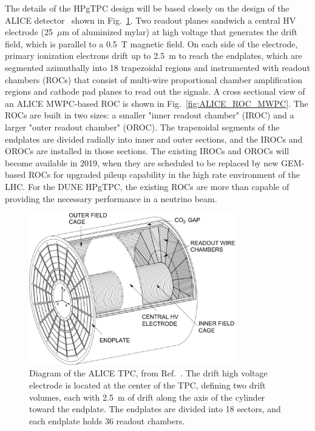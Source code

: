 The details of the HPgTPC design will be based closely on the design of the ALICE detector~\cite{Dellacasa:2000bm} shown in Fig.~\ref{fig:ALICETPC}. Two readout planes sandwich a central HV electrode (25~$\mu$m of aluminized mylar) at high voltage that generates the drift field, which is parallel to a 0.5~T magnetic field. On each side of the electrode, primary ionization electrons drift up to 2.5~m to reach the endplates, which are segmented azimuthally into 18 trapezoidal regions and instrumented with readout chambers (ROCs) that consist of multi-wire proportional chamber amplification regions and cathode pad planes to read out the signals. A cross sectional view of an ALICE MWPC-based ROC is shown in Fig.~\ref{fig:ALICE_ROC_MWPC}. The ROCs are built in two sizes: a smaller "inner readout chamber" (IROC) and a larger "outer readout chamber" (OROC). The trapezoidal segments of the endplates are divided radially into inner and outer sections, and the IROCs and OROCs are installed in those sections. The existing IROCs and OROCs will become available in 2019, when they are scheduled to be replaced by new GEM-based ROCs for upgraded pileup capability in the high rate environment of the LHC. For the DUNE HPgTPC, the existing ROCs are more than capable of providing the necessary performance in a neutrino beam.  

\begin{figure}[h]
    \centering
    \includegraphics[width=0.8\textwidth]{graphics/alice_tpc_highres.jpg}
    \caption{Diagram of the ALICE TPC, from Ref.~\cite{Alme:2010ke}. The drift high voltage electrode is located at the center of the TPC, defining two drift volumes, each with 2.5~m of drift along the axis of the cylinder toward the endplate. The endplates are divided into 18 sectors, and each endplate holds 36 readout chambers.}
    \label{fig:ALICETPC}
\end{figure}


